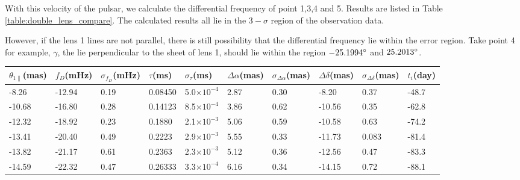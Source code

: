 \documentclass[useAMS,usenatbib]{mn2e}
\providecommand{\e}[1]{\ensuremath{\times 10^{#1}}}
\begin{document}
With this velocity of the pulsar, we calculate the differential frequency of point 1,3,4 and 5. Results are listed in Table \ref{table:double_lens_compare}. The calculated results all lie in the $3-\sigma$ region of the observation data. 

However, if the lens 1 lines are not parallel, there is still possibility that the differential frequency lie within the error region. Take point 4 for example, $\gamma$, the lie perpendicular to the sheet of lens 1, should lie within the region $-25.1994 \degree$ and $\-25.2013 \degree$.

\begin{table}
\centering
\begin{tabular}{llllllllll}
\hline
$\theta_{1\parallel}$(mas) &$f_D$(mHz) & $\sigma_{f_D}$(mHz) & $\tau$(ms) & $\sigma_{\tau}$(ms) & $\Delta\alpha$(mas) & $\sigma_{\Delta\alpha}$(mas) & $\Delta\delta$(mas) & $\sigma_{\Delta\delta}$(mas) & $t_i$(day)\\
\hline
 -8.26   & -12.94                            & 0.19      & 0.08450  & 5.0\e{-4}          & 2.87    & 0.30                                     & -8.20     & 0.37      & -48.7                                \\

-10.68   &-16.80                             & 0.28      & 0.14123 & 8.5\e{-4}         & 3.86    & 0.62                                     & -10.56    & 0.35      &-62.8                                \\

-12.32   &-18.92                            & 0.23      & 0.1880   & 2.1\e{-3}           & 5.06    & 0.59                                      & -10.58    & 0.63      &-74.2                        \\

-13.41 & -20.40                             & 0.49      & 0.2223   & 2.9\e{-3}           & 5.55    & 0.33                                      & -11.73    & 0.083      &-81.4                                \\

-13.82 &-21.17                            & 0.61      & 0.2363   & 2.3\e{-3}           & 5.12    & 0.36                                   & -12.56    & 0.47      &-83.3                                \\

-14.59   &-22.32                            & 0.47      & 0.26333  & 3.3\e{-4}          & 6.16    & 0.34                                     & -14.15    & 0.72       &-88.1                                \\


\end{tabular}
\end{table}
\end{document}
